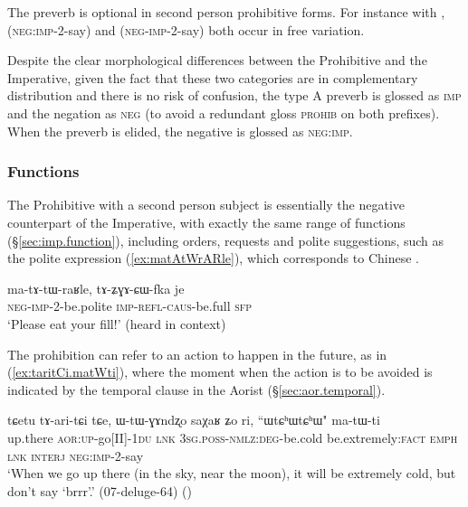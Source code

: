The preverb is optional in second person prohibitive forms. For instance with ,  (\textsc{neg}:\textsc{imp}-2-say) and  (\textsc{neg}-\textsc{imp}-2-say) both occur in free variation.

Despite the clear morphological differences between the Prohibitive and the Imperative, given the fact that these two categories are in complementary distribution and there is no risk of confusion, the type A preverb is glossed as \textsc{imp} and the negation as \textsc{neg} (to avoid a redundant gloss \textsc{prohib} on both prefixes).  When the preverb is elided, the negative  is glossed as \textsc{neg}:\textsc{imp}.
 
\subsubsection{Functions} \label{sec:prohib.function}
The Prohibitive with a second person subject is essentially the negative counterpart of the Imperative, with exactly the same range of functions (§\ref{sec:imp.function}), including orders,  requests and polite suggestions, such as the polite expression  (\ref{ex:matAtWrARle}), which corresponds to Chinese .

\begin{exe}
\ex  \label{ex:matAtWrARle}
\gll ma-tɤ-tɯ-raʁle, tɤ-ʑɣɤ-ɕɯ-fka je\\
\textsc{neg}-\textsc{imp}-2-be.polite \textsc{imp}-\textsc{refl}-\textsc{caus}-be.full \textsc{sfp} \\
\glt `Please eat your fill!' (heard in context)
\end{exe}

The prohibition can refer to an action to happen in the future, as in (\ref{ex:taritCi.matWti}), where the moment when the action is to be avoided is indicated by the temporal clause in the Aorist (§\ref{sec:aor.temporal}).

\begin{exe}
\ex  \label{ex:taritCi.matWti}
\gll tɕetu tɤ-ari-tɕi tɕe, ɯ-tɯ-ɣɤndʐo saχaʁ ʑo ri, ``ɯtɕʰɯtɕʰɯ" ma-tɯ-ti \\
up.there \textsc{aor}:\textsc{up}-go[II]-\textsc{1du} \textsc{lnk} \textsc{3sg}.\textsc{poss}-\textsc{nmlz}:\textsc{deg}-be.cold be.extremely:\textsc{fact} \textsc{emph} \textsc{lnk} \textsc{interj} \textsc{neg}:\textsc{imp}-2-say \\
\glt `When we go up there (in the sky, near the moon), it will be extremely cold, but don't say `brrr'.' (07-deluge-64) ()
\end{exe}
 

